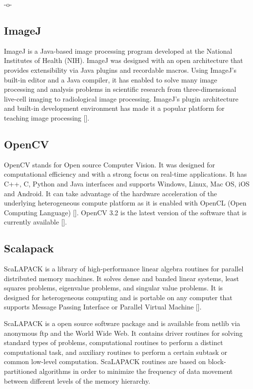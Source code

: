     -o-

\subsection{ImageJ}

ImageJ is a Java-based image processing program developed at the
National Institutes of Health (NIH). ImageJ was designed with an open
architecture that provides extensibility via Java plugins and
recordable macros.  Using ImageJ's built-in editor and a Java
compiler, it has enabled to solve many image processing and analysis
problems in scientific research from three-dimensional live-cell
imaging to radiological image processing.  ImageJ's plugin
architecture and built-in development environment has made it a
popular platform for teaching image processing [\cite{www-imagej}].

\subsection{OpenCV}

OpenCV stands for Open source Computer Vision. It was designed for
computational efficiency and with a strong focus on real-time
applications. It has C++, C, Python and Java interfaces and supports
Windows, Linux, Mac OS, iOS and Android. It can take advantage of the
hardware acceleration of the underlying heterogeneous compute platform
as it is enabled with OpenCL (Open Computing
Language) [\cite{www-opencv}]. OpenCV 3.2 is the latest version of the
software that is currently available [\cite{opencv-version}].

\subsection{Scalapack}

ScaLAPACK is a library of high-performance linear algebra routines for
parallel distributed memory machines. It solves dense and banded
linear systems, least squares problems, eigenvalue problems, and
singular value problems. It is designed for heterogeneous computing
and is portable on any computer that supports Message Passing
Interface or Parallel Virtual Machine [\cite{www-scalapack}].

ScaLAPACK is a open source software package and is available from
netlib via anonymous ftp and the World Wide Web. It contains driver
routines for solving standard types of problems, computational
routines to perform a distinct computational task, and auxiliary
routines to perform a certain subtask or common low-level
computation. ScaLAPACK routines are based on block-partitioned
algorithms in order to minimize the frequency of data movement between
different levels of the memory hierarchy.
    
